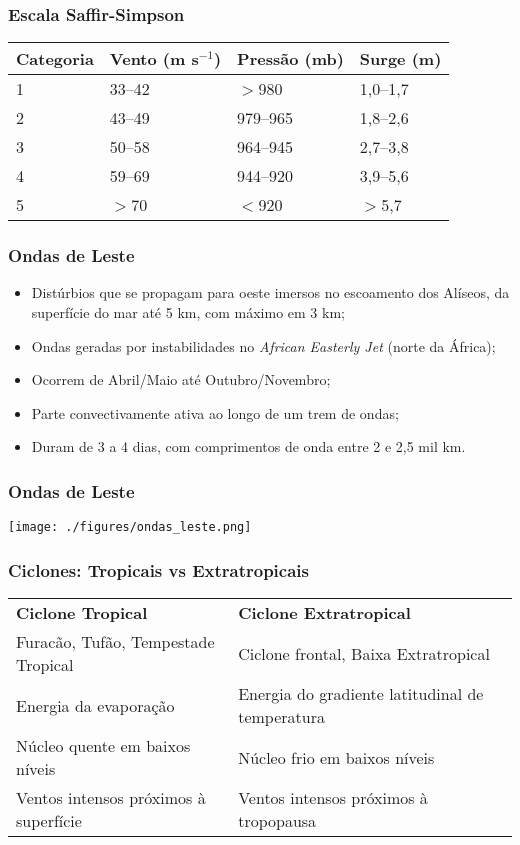 \begin{frame}
\frametitle{Escala Saffir-Simpson}
{\small
\begin{table}[h]
  \begin{tabular}{|l|l|l|l|}
  \hline
  {\bf Categoria} & {\bf Vento (m s$^{-1}$)} & \bf {Pressão (mb)} & {\bf Surge (m)}\\  \hline \hline
  1 &  33--42 & $>$980   & 1,0--1,7 \\ \hline
  2 &  43--49 & 979--965 & 1,8--2,6 \\ \hline
  3 &  50--58 & 964--945 & 2,7--3,8 \\ \hline
  4 &  59--69 & 944--920 & 3,9--5,6 \\ \hline
  5 &  $>$70  & $<$920   & $>$5,7   \\ \hline
  \end{tabular}
\end{table}
}
\end{frame}

\begin{frame}
\frametitle{Ondas de Leste}
\begin{itemize}[<+-| alert@+>]
  \item Distúrbios que se propagam para oeste imersos no escoamento dos
        Alíseos, da superfície do mar até 5 km, com máximo em 3 km;
  \item Ondas geradas por instabilidades no {\it African Easterly Jet} (norte
        da África);
  \item Ocorrem de Abril/Maio até Outubro/Novembro;
  \item Parte convectivamente ativa ao longo de um trem de ondas;
  \item Duram de 3 a 4 dias, com comprimentos de onda entre 2 e 2,5 mil km.
\end{itemize}
\end{frame}


\begin{frame}
\frametitle{Ondas de Leste}
  \begin{center}
    \texttt{[image: ./figures/ondas\_leste.png]}
  \end{center}
\end{frame}

\begin{frame}
\frametitle{Ciclones: Tropicais vs Extratropicais}
{\scriptsize
\begin{table}[h]
  \begin{tabular}{l|l}
  \hline\hline
  {\bf Ciclone Tropical} & {\bf Ciclone Extratropical} \\
  Furacão, Tufão, Tempestade Tropical & Ciclone frontal, Baixa Extratropical\\
  Energia da evaporação & Energia do gradiente latitudinal de temperatura \\
  Núcleo quente em baixos níveis & Núcleo frio em baixos níveis \\
  Ventos intensos próximos à superfície & Ventos intensos próximos à tropopausa \\
  \hline
  \end{tabular}
\end{table}
}
\end{frame}

